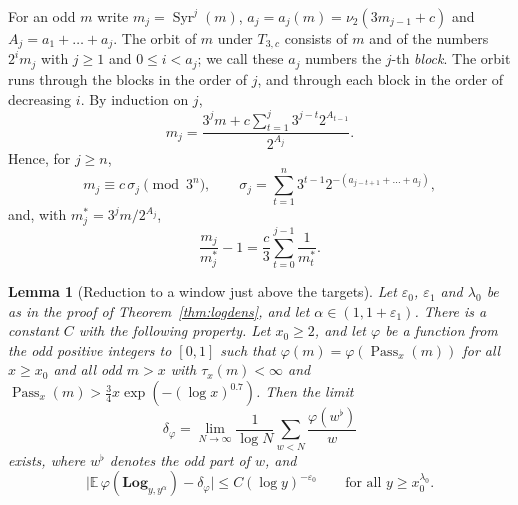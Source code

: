 \documentclass[12pt]{amsart}
\newtheorem{lemma}{Lemma}
\theoremstyle{definition}
\theoremstyle{remark}
\begin{document}
For an odd $m$ write $m_j=\operatorname{Syr}^j(m)$, $a_j=a_j(m)=\nu_2(3m_{j-1}+c)$ and $A_j=a_1+\dots+a_j$. The orbit of $m$ under $T_{3,c}$ consists of $m$ and of the numbers $2^im_j$ with $j\ge1$ and $0\le i<a_j$; we call these $a_j$ numbers the $j$-th \emph{block}. The orbit runs through the blocks in the order of $j$, and through each block in the order of decreasing $i$. By induction on $j$,
\begin{equation}
\label{eq:iterate}
m_j=\frac{3^jm+c\sum_{t=1}^{j}3^{j-t}2^{A_{t-1}}}{2^{A_j}} .
\end{equation}
Hence, for $j\ge n$,
\begin{equation}
\label{eq:residue}
m_j\equiv c\,\sigma_j\pmod{3^n},\qquad\sigma_j=\sum_{t=1}^{n}3^{t-1}2^{-(a_{j-t+1}+\dots+a_j)},
\end{equation}
and, with $m_j^*=3^jm/2^{A_j}$,
\begin{equation}
\label{eq:ideal}
\frac{m_j}{m_j^*}-1=\frac c3\sum_{t=0}^{j-1}\frac1{m_t^*}.
\end{equation}

\begin{lemma}[Reduction to a window just above the targets]
\label{lem:reduction}
Let $\varepsilon_0$, $\varepsilon_1$ and $\lambda_0$ be as in the proof of Theorem~\ref{thm:logdens}, and let $\alpha\in(1,1+\varepsilon_1)$. There is a constant $C$ with the following property. Let $x_0\ge2$, and let $\varphi$ be a function from the odd positive integers to $[0,1]$ such that $\varphi(m)=\varphi(\operatorname{Pass}_x(m))$ for all $x\ge x_0$ and all odd $m>x$ with $\tau_x(m)<\infty$ and $\operatorname{Pass}_x(m)>\tfrac34x\exp(-(\log x)^{0.7})$. Then the limit
\[
\delta_\varphi=\lim_{N\to\infty}\frac1{\log N}\sum_{w<N}\frac{\varphi(w^\flat)}{w}
\]
exists, where $w^\flat$ denotes the odd part of $w$, and
\[
\bigl|\mathbb E\,\varphi(\mathbf{Log}_{y,y^\alpha})-\delta_\varphi\bigr|\le C(\log y)^{-\varepsilon_0}\qquad\text{for all }y\ge x_0^{\lambda_0}.
\]
\end{lemma}
\end{document}
